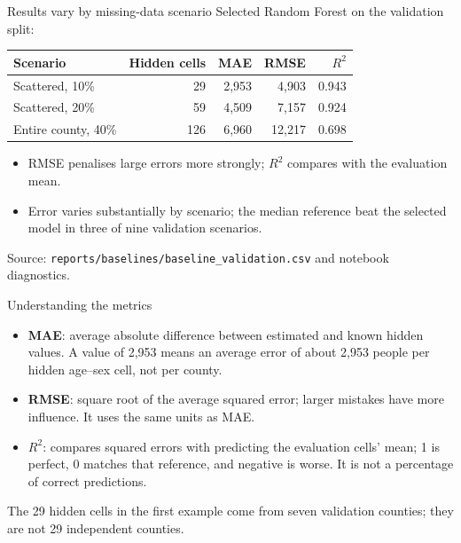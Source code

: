 \documentclass[aspectratio=169,11pt]{beamer}
\begin{document}
\begin{frame}{Results vary by missing-data scenario}
  \small Selected Random Forest on the validation split:
  \vspace{0.4em}
  \begin{center}
  \begin{tabular}{lrrrr}
    \toprule
    Scenario & Hidden cells & MAE & RMSE & $R^2$ \\
    \midrule
    Scattered, 10\% & 29 & 2,953 & 4,903 & 0.943 \\
    Scattered, 20\% & 59 & 4,509 & 7,157 & 0.924 \\
    Entire county, 40\% & 126 & 6,960 & 12,217 & 0.698 \\
    \bottomrule
  \end{tabular}
  \end{center}
  \begin{itemize}
    \item RMSE penalises large errors more strongly; $R^2$ compares with the evaluation mean.
    \item Error varies substantially by scenario; the median reference beat the selected
    model in three of nine validation scenarios.
  \end{itemize}
  \tiny Source: \texttt{reports/baselines/baseline\_validation.csv} and notebook diagnostics.
\end{frame}

\begin{frame}{Understanding the metrics}
  \begin{itemize}
    \item \textbf{MAE}: average absolute difference between estimated and known
    hidden values. A value of 2,953 means an average error of about 2,953 people
    per hidden age--sex cell, not per county.
    \item \textbf{RMSE}: square root of the average squared error; larger mistakes
    have more influence. It uses the same units as MAE.
    \item \textbf{$R^2$}: compares squared errors with predicting the evaluation
    cells' mean; 1 is perfect, 0 matches that reference, and negative is worse.
    It is not a percentage of correct predictions.
  \end{itemize}
  \small The 29 hidden cells in the first example come from seven validation
  counties; they are not 29 independent counties.
\end{frame}
\end{document}
